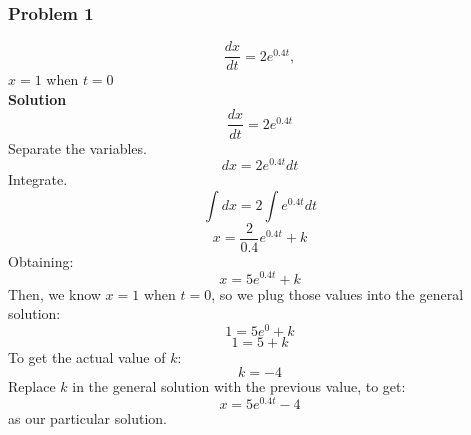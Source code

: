 \documentclass[hidelinks, a4paper, 12pt]{article}
\begin{document}
            \subsubsection{Problem 1}
                \[\frac{dx}{dt} = 2e^{0.4t},\]
                $x = 1$ when $t = 0$\\[\baselineskip]
                \textbf{Solution}
                \[\frac{dx}{dt} = 2e^{0.4t}\]
                Separate the variables.
                \[dx = 2e^{0.4t}dt\]
                Integrate.
                \[\int dx = 2\int e^{0.4t}dt\]
                \[x = \frac{2}{0.4}e^{0.4t} + k\]
                Obtaining: 
                \[x = 5e^{0.4t} + k\]
                Then, we know $x = 1$ when $t = 0$, so we plug those values into the general solution:
                \[1 = 5e^{0} + k\]
                \[1 = 5 + k\]
                To get the actual value of $k$:
                \[k = -4\]
                Replace $k$ in the general solution with the previous value, to get:
                \[x = 5e^{0.4t} - 4\]
                as our particular solution.
\end{document}

